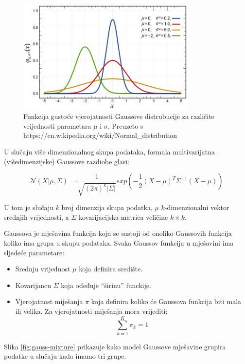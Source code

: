 \documentclass[utf8, diplomski, numeric]{fer}
\begin{document}
\begin{figure}[htb]
\includegraphics[width=0.8\textwidth]{images/gauss1.png}
\centering
\caption{Funkcija gustoće vjerojatnosti Gaussove distrubucije za različite vrijednosti parametara $\mu$ i $\sigma$. Preuzeto s  https://en.wikipedia.org/wiki/Normal\_distribution}
\label{fig:gauss1}
\end{figure}

U slučaju više dimenzionalnog skupa podataka, formula multivarijatna (višedimenzijske) Gaussove razdiobe glasi:

\begin{equation}
\mathcal{N}(X|\mu,\Sigma)  =\frac{1}{\sqrt{(2\pi)^{k}|\Sigma|}}exp(-\frac{1}{2}(X-\mu)^T\Sigma^{-1}(X-\mu))
\end{equation}

U tom je slučaju $k$ broj dimenzija skupa podatka, $\mu$ $k$-dimenzionalni vektor srednjih vrijednosti, a $\Sigma$ kovarijacijska matrica veličine $k \times k$.

Gaussova je mješavina funkcija koja se sastoji od onoliko Gaussovih funkcija koliko ima grupa u skupu podataka. Svaka Gaussov funkcija u mješavini ima sljedeće parametare:
\begin{itemize}
\item Srednju vrijednost $\mu$ koja definira središte.
\item Kovarijancu $\Sigma$  koja odeđuje ``širinu'' funckije.
\item Vjerojatnost miješanja $\pi$ koja definira koliko će Gaussova funkcija biti mala ili velika. Za vjerojatnosti miješanja mora vrijediti: 
\begin{equation}
\sum_{k=1}^{K}\pi_k = 1
\end{equation}
\end{itemize}

Slika \ref{fig:gauss-mixture} prikazuje kako model Gaussove mješavine grupira podatke u slučaju kada imamo tri grupe.
\end{document}
